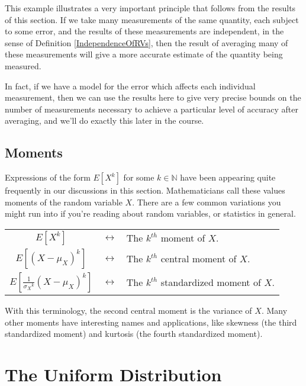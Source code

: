 This example illustrates a very important principle that follows from the results of this section. If we take many measurements of the same quantity, each subject to some error, and the results of these measurements are independent, in the sense of Definition \ref{IndependenceOfRVs}, then the result of averaging many of these measurements will give a more accurate estimate of the quantity being measured.

In fact, if we have a model for the error which affects each individual measurement, then we can use the results here to give very precise bounds on the number of measurements necessary to achieve a particular level of accuracy after averaging, and we'll do exactly this later in the course.

\subsection*{Moments}

Expressions of the form $E[X^k]$ for some $k \in \mathbb{N}$ have been appearing quite frequently in our discussions in this section. Mathematicians call these values moments of the random variable $X$. There are a few common variations you might run into if you're reading about random variables, or statistics in general.

\begin{center}
\begin{tabular}{ccl}
\vspace*{0.1in}
$E[X^k]$ & $\longleftrightarrow$ & The $k^{th}$ moment of $X$. \\
\vspace*{0.075in}
$E[(X-\mu_X)^k]$ & $\longleftrightarrow$ & The $k^{th}$ central moment of $X$. \\
$E\left[\frac{1}{{\sigma_X}^k}(X - \mu_X)^k\right]$ & $\longleftrightarrow$ & The $k^{th}$ standardized moment of $X$.  \\
\end{tabular}
\end{center}

With this terminology, the second central moment is the variance of $X$. Many other moments have interesting names and applications, like skewness (the third standardized moment) and kurtosis (the fourth standardized moment).

\section{The Uniform Distribution}

